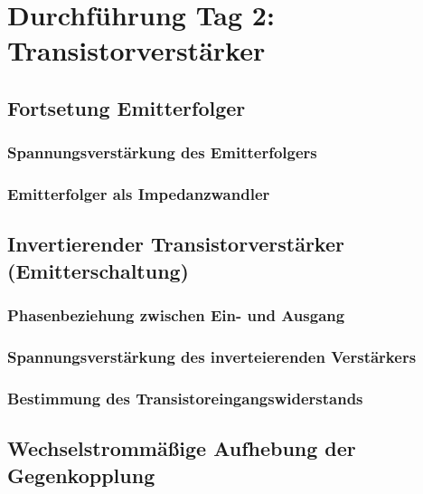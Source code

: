 \section{Durchführung Tag 2: Transistorverstärker}

\subsection{Fortsetung Emitterfolger}

\subsubsection{Spannungsverstärkung des Emitterfolgers}

\fehlt

\subsubsection{Emitterfolger als Impedanzwandler}

\fehlt

\subsection{Invertierender Transistorverstärker (Emitterschaltung)}

\subsubsection{Phasenbeziehung zwischen Ein- und Ausgang}

\fehlt

\subsubsection{Spannungsverstärkung des inverteierenden Verstärkers}

\fehlt

\subsubsection{Bestimmung des Transistoreingangswiderstands}

\fehlt

\subsection{Wechselstrommäßige Aufhebung der Gegenkopplung}

\fehlt

